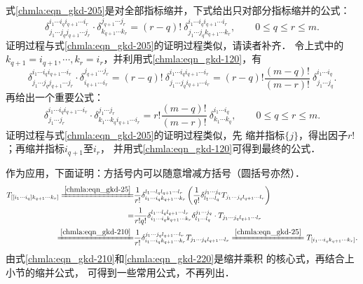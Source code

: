 式\eqref{chmla:eqn_gkd-205}是对全部指标缩并，下式给出只对部分指标缩并的公式：
\begin{equation}\label{chmla:eqn_gkd-210}
    \delta_{j_1 \cdots j_q j_{q+1}\cdots j_r}^{i_1 \cdots i_q i_{q+1}\cdots i_r}
    \cdot \delta_{k_{q+1} \cdots k_r}^{j_{q+1} \cdots j_r}
    =(r-q)! \ \delta_{j_1 \cdots j_q k_{q+1}\cdots k_r}^{i_1 \cdots i_q i_{q+1}\cdots i_r} ,
    \qquad 0 \leqslant q \leqslant r \leqslant m .
\end{equation}
证明过程与式\eqref{chmla:eqn_gkd-205}的证明过程类似，请读者补齐．
令上式中的$k_{q+1}=i_{q+1},\cdots, k_r=i_r$，并利用式\eqref{chmla:eqn_gkd-120}，有
\begin{equation}\label{chmla:eqn_gkd-215}
    \delta_{j_1 \cdots j_q j_{q+1}\cdots j_r}^{i_1 \cdots i_q i_{q+1}\cdots i_r}
    \cdot \delta_{i_{q+1} \cdots i_r}^{j_{q+1} \cdots j_r}
    =(r-q)! \ \delta_{j_1 \cdots j_q i_{q+1}\cdots i_r}^{i_1 \cdots i_q i_{q+1}\cdots i_r}
    =(r-q)! \frac{(m-q)!}{(m-r)!}  \ \delta_{j_1 \cdots j_q}^{i_1 \cdots i_q} .
\end{equation}
再给出一个重要公式：
\begin{equation}\label{chmla:eqn_gkd-220}
    \delta_{j_1 \cdots j_r}^{i_1 \cdots i_q i_{q+1}\cdots i_r}
    \cdot \delta_{k_{1}\cdots k_q i_{q+1} \cdots i_r}^{j_1  \cdots j_r}
    =r! \frac{(m-q)!}{(m-r)!}  \ \delta_{k_1 \cdots k_q}^{i_1 \cdots i_q} ,
    \qquad 0 \leqslant q \leqslant r \leqslant m .
\end{equation}
证明过程与式\eqref{chmla:eqn_gkd-205}的证明过程类似，先
缩并指标$\{j\}$，得出因子$r!$；再缩并指标$i_{q+1}$至$i_r$，
并用式\eqref{chmla:eqn_gkd-120}可得到最终的公式．


作为应用，下面证明：方括号内可以随意增减方括号（圆括号亦然）．
\begin{align*}
    T_{[[i_1 \cdots i_q] k_{q+1}\cdots k_{r}]} \xlongequal{\ref{chmla:eqn_gkd-25}}&
    \frac{1}{r!}    \delta_{i_1 \cdots i_q k_{q+1}\cdots k_{r} }^{l_1 \cdots l_q l_{q+1}\cdots l_r}
      \left( \frac{1}{q!}\delta_{l_1 \cdots l_q}^{j_1 \cdots j_q}
      T_{j_1 \cdots j_q l_{q+1}\cdots l_{r}}\right)   \\
     =&\frac{1}{r! q!}    \delta_{i_1 \cdots i_q k_{q+1}\cdots k_{r} }^{l_1 \cdots l_q l_{q+1}\cdots l_r}
    \delta_{l_1 \cdots l_q}^{j_1 \cdots j_q} \cdot  T_{j_1 \cdots j_q l_{q+1}\cdots l_{r}}  \\
    \xlongequal{\ref{chmla:eqn_gkd-210}}&
    \frac{1}{r!}  \delta_{i_1 \cdots i_q k_{q+1}\cdots k_{r} }^{j_1 \cdots j_q l_{q+1}\cdots l_r}
    T_{j_1 \cdots j_q l_{q+1}\cdots l_{r}} 
    \xlongequal{\ref{chmla:eqn_gkd-25}}     T_{[i_1 \cdots i_q k_{q+1}\cdots k_{r}]} .
\end{align*}
由式\eqref{chmla:eqn_gkd-210}和\eqref{chmla:eqn_gkd-220}是缩并乘积
的核心式，再结合上小节的缩并公式，
可得到一些常用公式，不再列出．

